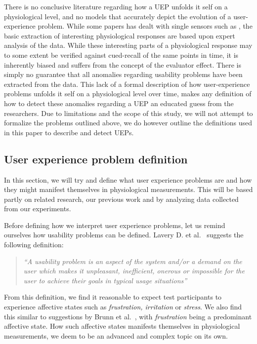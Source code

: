 There is no conclusive literature regarding how a UEP unfolds it self on a physiological level, and no models that accurately depict the evolution of a user-experience problem. 
While some papers has dealt with single sensors such as \cite{mind_the_gap} \cite{LH-paper}, the basic extraction of interesting physiological responses are based upon expert analysis of the data.
While these interesting parts of a physiological response may to some extent be verified against cued-recall of the same points in time, it is inherently biased and suffers from the concept of the evaluator effect. 
There is simply no guarantee that all anomalies regarding usability problems have been extracted from the data.
This lack of a formal description of how user-experience problems unfolds it self on a physiological level over time, makes any definition of how to detect these anomalies regarding a UEP an educated guess from the researchers.
Due to limitations and the scope of this study, we will not attempt to formalize the problems outlined above, we do however outline the definitions used in this paper to describe and detect UEPs.

\subsection{User experience problem definition}
In this section, we will try and define what user experience problems are and how they might manifest themselves in
physiological measurements. This will be based partly on related research, our previous work and by analyzing data
collected from our experiments.

Before defining how we interpret user experience problems, let us remind ourselves how usability problems can be
defined. Lavery D. et al.~\cite[p. 254]{comp-eval-methods} suggests the following definition:

\begin{quotation}
  \textit{``A usability problem is an aspect of the system and/or a demand on the user which makes it unpleasant,
    inefficient, onerous or impossible for the user to achieve their goals in typical usage situations''} 
\end{quotation}

From this definition, we find it reasonable to expect test participants to experience affective states such as
\textit{frustration, irritation} or \textit{stress}. We also find this similar to suggestions by Brunn et
al.~\cite{LH-paper}, with \textit{frustration} being a predominant affective state. How such affective states manifests
themselves in physiological measurements, we deem to be an advanced and complex topic on its own.

